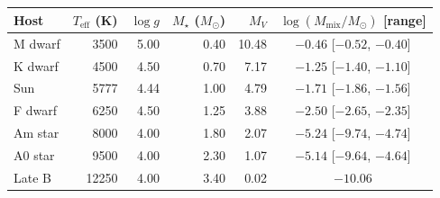 \begin{tabular}{lrrrrc}
\toprule
Host & $T_\mathrm{eff}$ (K) & $\log g$ & $M_\star$ ($M_\odot$) & $M_V$ & $\log(M_\mathrm{mix}/M_\odot)$ [range] \\
\midrule
M dwarf & 3500 & 5.00 & 0.40 & 10.48 & $-0.46$ [$-0.52$, $-0.40$] \\
K dwarf & 4500 & 4.50 & 0.70 & 7.17 & $-1.25$ [$-1.40$, $-1.10$] \\
Sun & 5777 & 4.44 & 1.00 & 4.79 & $-1.71$ [$-1.86$, $-1.56$] \\
F dwarf & 6250 & 4.50 & 1.25 & 3.88 & $-2.50$ [$-2.65$, $-2.35$] \\
Am star & 8000 & 4.00 & 1.80 & 2.07 & $-5.24$ [$-9.74$, $-4.74$] \\
A0 star & 9500 & 4.00 & 2.30 & 1.07 & $-5.14$ [$-9.64$, $-4.64$] \\
Late B & 12250 & 4.00 & 3.40 & 0.02 & $-10.06$ \\
\bottomrule
\end{tabular}
